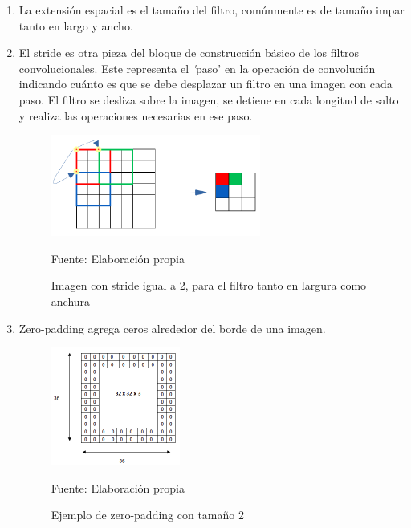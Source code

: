 		\begin{enumerate}
			\item La extensión espacial es el tamaño del filtro, comúnmente es de tamaño impar tanto en largo y ancho.
			
			\item El stride es otra pieza del bloque de construcción básico de los filtros convolucionales. Este representa el {\textit 'paso'} en la operación de convolución indicando cuánto es que se debe desplazar un filtro en una imagen con cada paso. El filtro se desliza sobre la imagen, se detiene en cada longitud de salto y realiza las operaciones necesarias en ese paso.

				\begin{figure}[H]
				\begin{center}
				\includegraphics[width=0.65\textwidth]{images/marcoteorico/stride}
				\end{center}
				\begin{center}
				\caption{\small{Imagen con stride igual a 2, para el filtro tanto en largura como anchura}}
				\vspace{-0.5em}
				{\small{Fuente: Elaboración propia}}
				\end{center}
				\vspace{-1.9em}
				\end{figure}
			\item Zero-padding agrega ceros alrededor del borde de una imagen.
				\begin{figure}[H]
				\begin{center}
				\includegraphics[width=0.4\textwidth]{images/marcoteorico/PAD2}
				\end{center}
				\begin{center}
				\caption{\small{Ejemplo de zero-padding con tamaño 2}}
				\vspace{-0.5em}
				{\small{Fuente: Elaboración propia}}
				\end{center}
				\vspace{-1.9em}
				\end{figure}


\end{enumerate}
